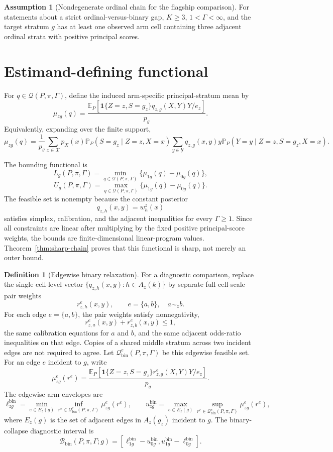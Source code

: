 \documentclass[11pt]{article}
\newcommand{\E}{\mathbb{E}}
\renewcommand{\Pr}{\mathbb{P}}
\newcommand{\one}{\mathbf{1}}
\theoremstyle{definition}
\newtheorem{definition}{Definition}
\newtheorem{assumption}{Assumption}
\theoremstyle{plain}
\theoremstyle{remark}
\begin{document}
\begin{assumption}[Nondegenerate ordinal chain for the flagship comparison]\label{ass:nondegenerate-chain}
For statements about a strict ordinal-versus-binary gap, \(K\ge3\),
\(1<\Gamma<\infty\), and the target stratum \(g\) has at least one observed
arm cell containing three adjacent ordinal strata with positive principal
scores.
\end{assumption}

\section{Estimand-defining functional}
For \(q\in\mathcal Q(P,\pi,\Gamma)\), define the induced arm-specific
principal-stratum mean by
\[
  \mu_{zg}(q)
  =
  \frac{
    \E_P\!\left[
      \one\{Z=z,S=g_z\}q_{z,g}(X,Y)Y/e_z
    \right]
  }{p_g}.
\]
Equivalently, expanding over the finite support,
\[
  \mu_{zg}(q)
  =
  \frac{1}{p_g}
  \sum_{x\in\mathcal X} p_X(x)
  \Pr_P(S=g_z\mid Z=z,X=x)
  \sum_{y\in\mathcal Y}
  q_{z,g}(x,y)y
  \Pr_P(Y=y\mid Z=z,S=g_z,X=x).
\]

The bounding functional is
\[
  L_g(P,\pi,\Gamma)
  =
  \min_{q\in\mathcal Q(P,\pi,\Gamma)}
  \{\mu_{1g}(q)-\mu_{0g}(q)\},
\]
\[
  U_g(P,\pi,\Gamma)
  =
  \max_{q\in\mathcal Q(P,\pi,\Gamma)}
  \{\mu_{1g}(q)-\mu_{0g}(q)\}.
\]
The feasible set is nonempty because the constant posterior
\[
  q_{z,h}(x,y)=w^z_h(x)
\]
satisfies simplex, calibration, and the adjacent inequalities for every
\(\Gamma\ge1\).  Since all constraints are linear after multiplying by the
fixed positive principal-score weights, the bounds are finite-dimensional
linear-program values.  Theorem~\ref{thm:sharp-chain} proves that this
functional is sharp, not merely an outer bound.

\begin{definition}[Edgewise binary relaxation]\label{def:binary-relaxation}
For a diagnostic comparison, replace the single cell-level vector
\(\{q_{z,h}(x,y):h\in A_z(k)\}\) by separate full-cell-scale pair weights
\[
  r^e_{z,h}(x,y),\qquad e=\{a,b\},\quad a\sim_z b.
\]
For each edge \(e=\{a,b\}\), the pair weights satisfy nonnegativity,
\[
  r^e_{z,a}(x,y)+r^e_{z,b}(x,y)\le1,
\]
the same calibration equations for \(a\) and \(b\), and the same adjacent
odds-ratio inequalities on that edge.  Copies of a shared middle stratum across
two incident edges are not required to agree.  Let
\(\mathcal Q^e_{\mathrm{bin}}(P,\pi,\Gamma)\) be this edgewise feasible set.
For an edge \(e\) incident to \(g\), write
\[
  \mu^e_{zg}(r^e)
  =
  \frac{
    \E_P[
      \one\{Z=z,S=g_z\}r^e_{z,g}(X,Y)Y/e_z
    ]
  }{p_g}.
\]
The edgewise arm envelopes are
\[
  \ell^{\mathrm{bin}}_{zg}
  =
  \min_{e\in E_z(g)}
  \inf_{r^e\in\mathcal Q^e_{\mathrm{bin}}(P,\pi,\Gamma)}
  \mu^e_{zg}(r^e),
  \qquad
  u^{\mathrm{bin}}_{zg}
  =
  \max_{e\in E_z(g)}
  \sup_{r^e\in\mathcal Q^e_{\mathrm{bin}}(P,\pi,\Gamma)}
  \mu^e_{zg}(r^e),
\]
where \(E_z(g)\) is the set of adjacent edges in \(A_z(g_z)\) incident to
\(g\).  The binary-collapse diagnostic interval is
\[
  \mathcal B_{\mathrm{bin}}(P,\pi,\Gamma;g)
  =
  [\ell^{\mathrm{bin}}_{1g}-u^{\mathrm{bin}}_{0g},
   u^{\mathrm{bin}}_{1g}-\ell^{\mathrm{bin}}_{0g}].
\]
\end{definition}
\end{document}
